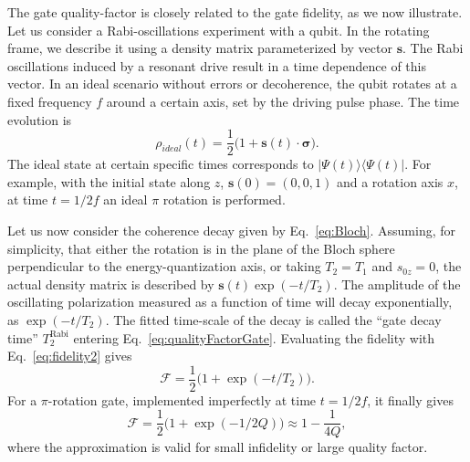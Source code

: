 \documentclass[aps, prx, showpacs, twocolumn, superscriptaddress, notitlepage, longbibliography, floatfix, nofootinbib]{revtex4-2}
\newcommand{\TRabi}{T_2^\mathrm{Rabi}}
\begin{document}
\label{app:fidelity-quality}

The gate quality-factor is closely related to the gate fidelity, as we now illustrate. Let us consider a Rabi-oscillations experiment with a qubit. In the rotating frame, we describe it using a density matrix parameterized by vector $\mathbf{s}$. The Rabi oscillations induced by a resonant drive result in a time dependence of this vector. In an ideal scenario without errors or decoherence, the qubit rotates at a fixed frequency $f$ around a certain axis, set by the driving pulse phase. The time evolution is 
\begin{equation}
\rho_{ideal}(t) = \frac{1}{2}\Big(1+\mathbf{s}(t) \cdot \boldsymbol{\sigma}\Big).
\end{equation}
The ideal state at certain specific times corresponds to $|\Psi(t)\rangle\langle\Psi(t)|$. For example, with the initial state along $z$, $\mathbf{s}(0)=(0,0,1)$ and a rotation axis $x$, at time $t=1/2f$ an ideal $\pi$ rotation is performed. 

Let us now consider the coherence decay given by Eq.~\eqref{eq:Bloch}. Assuming, for simplicity, that either the rotation is in the plane of the Bloch sphere perpendicular to the energy-quantization axis, or taking $T_2=T_1$ and $s_{0z}=0$, the actual density matrix is described by $\mathbf{s}(t) \exp(-t/T_2)$. The amplitude of the oscillating polarization measured as a function of time will decay exponentially, as $\exp(-t/T_2)$. The fitted time-scale of the decay is called the ``gate decay time'' $ \TRabi$ entering Eq.~\eqref{eq:qualityFactorGate}. Evaluating the fidelity with Eq.~\eqref{eq:fidelity2} gives
\begin{equation}
\mathcal{F} = \frac{1}{2}\big(1+\exp(-t/T_2) \big).
\end{equation}
For a $\pi$-rotation gate, implemented imperfectly at time $t=1/2f$, it finally gives
\begin{equation}
\mathcal{F} = \frac{1}{2}\big(1+\exp(-1/2Q) \big) \approx 1 - \frac{1}{4Q},
\label{eq:fidelityQualityRelation}
\end{equation}
where the approximation is valid for small infidelity or large quality factor. 
\end{document}
